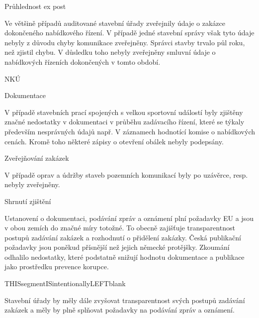 \documentclass[10pt]{article}
\begin{document}
Průhlednost ex post

Ve většině případů auditované stavební úřady zveřejnily údaje o zakázce dokončeného nabídkového řízení.
V případě jedné stavební správy však tyto údaje nebyly z důvodu chyby komunikace zveřejněny.
Správci stavby trvalo půl roku, než zjistil chybu.
V důsledku toho nebyly zveřejněny smluvní údaje o nabídkových řízeních dokončených v tomto období.


NKÚ



Dokumentace

V případě stavebních prací spojených s velkou sportovní událostí byly zjištěny značné nedostatky v dokumentaci v průběhu zadávacího řízení, které se týkaly především nesprávných údajů např. V záznamech hodnotící komise o nabídkových cenách.
Kromě toho některé zápisy o otevření obálek nebyly podepsány.


Zveřejňování zakázek

V případě oprav a údržby staveb pozemních komunikací byly po uzávěrce, resp. nebyly zveřejněny.


Shrnutí zjištění

Ustanovení o dokumentaci, podávání zpráv a oznámení plní požadavky EU a jsou v obou zemích do značné míry totožné.
To obecně zajišťuje transparentnost postupů zadávání zakázek a rozhodnutí o přidělení zakázky.
Česká publikační požadavky jsou poněkud přísnější než jejich německé protějšky.
Zkoumání odhalilo nedostatky, které podstatně snižují hodnotu dokumentace a publikace jako prostředku prevence korupce.


THISsegmentISintentionallyLEFTblank

Stavební úřady by měly dále zvyšovat transparentnost svých postupů zadávání zakázek a měly by plně splňovat požadavky na podávání zpráv a oznámení.
\end{document}
